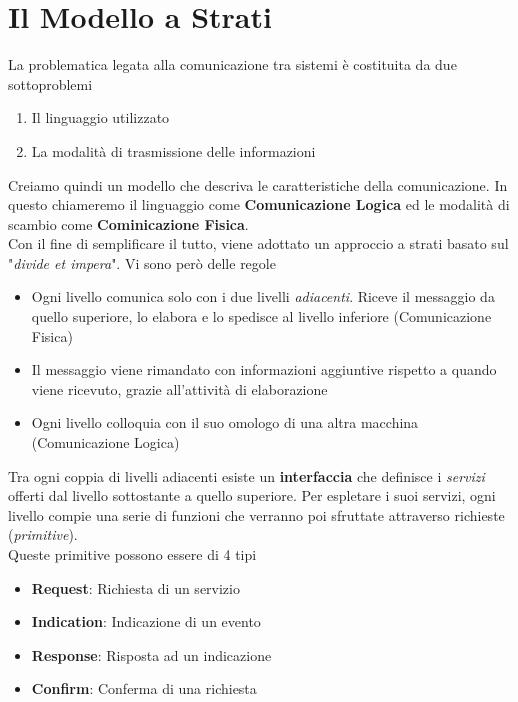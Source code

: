 \documentclass{article}
\begin{document}
\newpage                    
    \section{Il Modello a Strati}
        La problematica legata alla comunicazione tra sistemi è costituita da due sottoproblemi
        \begin{enumerate}
            \item Il linguaggio utilizzato
            \item La modalità di trasmissione delle informazioni
        \end{enumerate}               
        Creiamo quindi un modello che descriva le caratteristiche della comunicazione. In questo chiameremo il linguaggio come \textbf{Comunicazione Logica} ed le modalità di scambio come \textbf{Cominicazione Fisica}.\\
        Con il fine di semplificare il tutto, viene adottato un approccio a strati basato sul "\textit{divide et impera}". Vi sono però delle regole
        \begin{itemize}
            \item Ogni livello comunica solo con i due livelli \textit{adiacenti}. Riceve il messaggio da quello superiore, lo elabora e lo spedisce al livello inferiore (Comunicazione Fisica)
            \item Il messaggio viene rimandato con informazioni aggiuntive rispetto a quando viene ricevuto, grazie all'attività di elaborazione
            \item Ogni livello colloquia con il suo omologo di una altra macchina (Comunicazione Logica) 
        \end{itemize}
        Tra ogni coppia di livelli adiacenti esiste un \textbf{interfaccia} che definisce i \textit{servizi} offerti dal livello sottostante a quello superiore. Per espletare i suoi servizi, ogni livello compie una serie di funzioni che verranno poi sfruttate attraverso richieste (\textit{primitive}).\\
        Queste primitive possono essere di 4 tipi
        \begin{itemize}
            \item \textbf{Request}: Richiesta di un servizio
            \item \textbf{Indication}: Indicazione di un evento
            \item \textbf{Response}: Risposta ad un indicazione
            \item \textbf{Confirm}: Conferma di una richiesta 
        \end{itemize}
\end{document}
